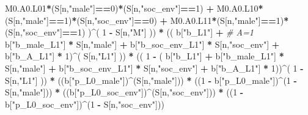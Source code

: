 \documentclass[
]{book}
\newenvironment{Shaded}{\begin{snugshade}}{\end{snugshade}}
\newcommand{\CommentTok}[1]{\textcolor[rgb]{0.56,0.35,0.01}{\textit{#1}}}
\newcommand{\DecValTok}[1]{\textcolor[rgb]{0.00,0.00,0.81}{#1}}
\newcommand{\NormalTok}[1]{#1}
\newcommand{\SpecialCharTok}[1]{\textcolor[rgb]{0.81,0.36,0.00}{\textbf{#1}}}
\newcommand{\StringTok}[1]{\textcolor[rgb]{0.31,0.60,0.02}{#1}}
\begin{document}
\begin{Shaded}
\begin{Highlighting}[]
\NormalTok{          M0.A0.L01}\SpecialCharTok{*}\NormalTok{(S[n,}\StringTok{"male"}\NormalTok{]}\SpecialCharTok{==}\DecValTok{0}\NormalTok{)}\SpecialCharTok{*}\NormalTok{(S[n,}\StringTok{"soc\_env"}\NormalTok{]}\SpecialCharTok{==}\DecValTok{1}\NormalTok{) }\SpecialCharTok{+}
\NormalTok{          M0.A0.L10}\SpecialCharTok{*}\NormalTok{(S[n,}\StringTok{"male"}\NormalTok{]}\SpecialCharTok{==}\DecValTok{1}\NormalTok{)}\SpecialCharTok{*}\NormalTok{(S[n,}\StringTok{"soc\_env"}\NormalTok{]}\SpecialCharTok{==}\DecValTok{0}\NormalTok{) }\SpecialCharTok{+} 
\NormalTok{          M0.A0.L11}\SpecialCharTok{*}\NormalTok{(S[n,}\StringTok{"male"}\NormalTok{]}\SpecialCharTok{==}\DecValTok{1}\NormalTok{)}\SpecialCharTok{*}\NormalTok{(S[n,}\StringTok{"soc\_env"}\NormalTok{]}\SpecialCharTok{==}\DecValTok{1}\NormalTok{) )}\SpecialCharTok{\^{}}\NormalTok{( }\DecValTok{1} \SpecialCharTok{{-}}\NormalTok{ S[n,}\StringTok{"M"}\NormalTok{] )) }\SpecialCharTok{*}
\NormalTok{      (( b[}\StringTok{"b\_L1"}\NormalTok{] }\SpecialCharTok{+}                                                            \CommentTok{\# A=1}
\NormalTok{           b[}\StringTok{"b\_male\_L1"}\NormalTok{] }\SpecialCharTok{*}\NormalTok{ S[n,}\StringTok{"male"}\NormalTok{] }\SpecialCharTok{+}  
\NormalTok{           b[}\StringTok{"b\_soc\_env\_L1"}\NormalTok{] }\SpecialCharTok{*}\NormalTok{ S[n,}\StringTok{"soc\_env"}\NormalTok{] }\SpecialCharTok{+}
\NormalTok{           b[}\StringTok{"b\_A\_L1"}\NormalTok{] }\SpecialCharTok{*} \DecValTok{1}\NormalTok{)}\SpecialCharTok{\^{}}\NormalTok{( S[n,}\StringTok{"L1"}\NormalTok{] )) }\SpecialCharTok{*}
\NormalTok{      (( }\DecValTok{1} \SpecialCharTok{{-}}\NormalTok{ ( b[}\StringTok{"b\_L1"}\NormalTok{] }\SpecialCharTok{+}
\NormalTok{                 b[}\StringTok{"b\_male\_L1"}\NormalTok{] }\SpecialCharTok{*}\NormalTok{ S[n,}\StringTok{"male"}\NormalTok{] }\SpecialCharTok{+}  
\NormalTok{                 b[}\StringTok{"b\_soc\_env\_L1"}\NormalTok{] }\SpecialCharTok{*}\NormalTok{ S[n,}\StringTok{"soc\_env"}\NormalTok{] }\SpecialCharTok{+}
\NormalTok{                 b[}\StringTok{"b\_A\_L1"}\NormalTok{] }\SpecialCharTok{*} \DecValTok{1}\NormalTok{))}\SpecialCharTok{\^{}}\NormalTok{( }\DecValTok{1} \SpecialCharTok{{-}}\NormalTok{ S[n,}\StringTok{"L1"}\NormalTok{] )) }\SpecialCharTok{*}
\NormalTok{      ((b[}\StringTok{"p\_L0\_male"}\NormalTok{])}\SpecialCharTok{\^{}}\NormalTok{(S[n,}\StringTok{"male"}\NormalTok{])) }\SpecialCharTok{*} 
\NormalTok{      ((}\DecValTok{1} \SpecialCharTok{{-}}\NormalTok{ b[}\StringTok{"p\_L0\_male"}\NormalTok{])}\SpecialCharTok{\^{}}\NormalTok{(}\DecValTok{1} \SpecialCharTok{{-}}\NormalTok{ S[n,}\StringTok{"male"}\NormalTok{])) }\SpecialCharTok{*} 
\NormalTok{      ((b[}\StringTok{"p\_L0\_soc\_env"}\NormalTok{])}\SpecialCharTok{\^{}}\NormalTok{(S[n,}\StringTok{"soc\_env"}\NormalTok{])) }\SpecialCharTok{*}
\NormalTok{      ((}\DecValTok{1} \SpecialCharTok{{-}}\NormalTok{ b[}\StringTok{"p\_L0\_soc\_env"}\NormalTok{])}\SpecialCharTok{\^{}}\NormalTok{(}\DecValTok{1} \SpecialCharTok{{-}}\NormalTok{ S[n,}\StringTok{"soc\_env"}\NormalTok{])) }
    

\end{Highlighting}
\end{Shaded}
\end{document}
